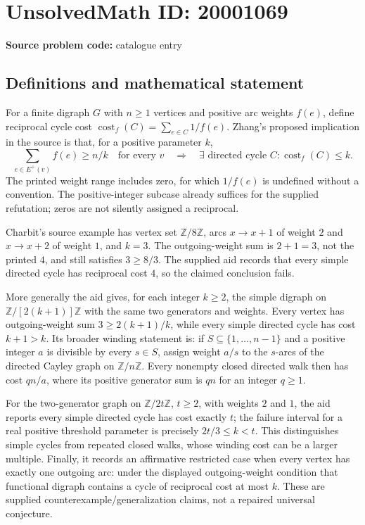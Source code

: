 \documentclass[11pt]{article}
\newcommand{\Z}{\mathbb{Z}}
\begin{document}
\section*{UnsolvedMath ID: 20001069}
\textbf{Source problem code:} catalogue entry
\subsection{Definitions and mathematical statement}
For a finite digraph $G$ with $n\geq1$ vertices and positive arc weights $f(e)$, define reciprocal cycle cost $\operatorname{cost}_f(C)=\sum_{e\in C}1/f(e)$. Zhang's proposed implication in the source is that, for a positive parameter $k$,
\[
 \sum_{e\in E^+(v)}f(e)\geq n/k\quad\text{for every }v
 \quad\Longrightarrow\quad
 \exists\text{ directed cycle }C:\operatorname{cost}_f(C)\leq k.
\]
The printed weight range includes zero, for which $1/f(e)$ is undefined without a convention. The positive-integer subcase already suffices for the supplied refutation; zeros are not silently assigned a reciprocal.

Charbit's source example has vertex set $\Z/8\Z$, arcs $x\to x+1$ of weight $2$ and $x\to x+2$ of weight $1$, and $k=3$. The outgoing-weight sum is $2+1=3$, not the printed $4$, and still satisfies $3\geq8/3$. The supplied aid records that every simple directed cycle has reciprocal cost $4$, so the claimed conclusion fails.

More generally the aid gives, for each integer $k\geq2$, the simple digraph on $\Z/[2(k+1)]\Z$ with the same two generators and weights. Every vertex has outgoing-weight sum $3\geq2(k+1)/k$, while every simple directed cycle has cost $k+1>k$. Its broader winding statement is: if $S\subseteq\{1,\ldots,n-1\}$ and a positive integer $a$ is divisible by every $s\in S$, assign weight $a/s$ to the $s$-arcs of the directed Cayley graph on $\Z/n\Z$. Every nonempty closed directed walk then has cost $qn/a$, where its positive generator sum is $qn$ for an integer $q\geq1$.

For the two-generator graph on $\Z/2t\Z$, $t\geq2$, with weights $2$ and $1$, the aid reports every simple directed cycle has cost exactly $t$; the failure interval for a real positive threshold parameter is precisely $2t/3\leq k<t$. This distinguishes simple cycles from repeated closed walks, whose winding cost can be a larger multiple. Finally, it records an affirmative restricted case when every vertex has exactly one outgoing arc: under the displayed outgoing-weight condition that functional digraph contains a cycle of reciprocal cost at most $k$. These are supplied counterexample/generalization claims, not a repaired universal conjecture.
\end{document}
